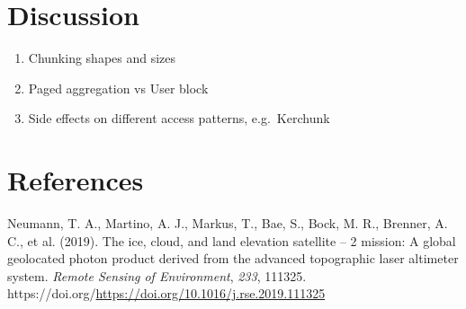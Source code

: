 \documentclass[
]{agujournal2019}
\providecommand{\tightlist}{%
  \setlength{\itemsep}{0pt}\setlength{\parskip}{0pt}}\usepackage{longtable,booktabs,array}
\newlength{\cslhangindent}
\newenvironment{CSLReferences}[2] %
 {\begin{list}{}{%
  \setlength{\itemindent}{0pt}
  \setlength{\leftmargin}{0pt}
  \setlength{\parsep}{0pt}
  \ifodd #1
   \setlength{\leftmargin}{\cslhangindent}
   \setlength{\itemindent}{-1\cslhangindent}
  \fi
  \setlength{\itemsep}{#2\baselineskip}}}
 {\end{list}}
\begin{document}
\section{Discussion}\label{discussion}

\begin{enumerate}
\def\labelenumi{\arabic{enumi}.}
\tightlist
\item
  Chunking shapes and sizes
\item
  Paged aggregation vs User block
\item
  Side effects on different access patterns, e.g.~Kerchunk
\end{enumerate}

\section*{References}\label{references}

\label{refs}
\begin{CSLReferences}{1}{0}
\vspace{1em}

Neumann, T. A., Martino, A. J., Markus, T., Bae, S., Bock, M. R.,
Brenner, A. C., et al. (2019). The ice, cloud, and land elevation
satellite -- 2 mission: A global geolocated photon product derived from
the advanced topographic laser altimeter system. \emph{Remote Sensing of
Environment}, \emph{233}, 111325.
https://doi.org/\url{https://doi.org/10.1016/j.rse.2019.111325}

\end{CSLReferences}
\end{document}
